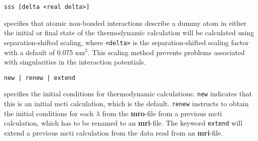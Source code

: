 \begin{description}
\item
\begin{verbatim}
sss [delta <real delta>]
\end{verbatim}
specifies that atomic non-bonded interactions describe a dummy atom
in either the initial or final state of the thermodynamic calculation
will be calculated using separation-shifted scaling, where \verb+<delta>+ 
is the separation-shifted scaling factor with a default of 0.075 nm$^2$.
This scaling method prevents problems associated with singularities in
the interaction potentials.

\item
\begin{verbatim}
new | renew | extend
\end{verbatim}
specifies the initial conditions for thermodynamic calculations.
{\tt new} indicates that this is an initial mcti calculation, which
is the default. {\tt renew} instructs to obtain the initial
conditions for each $\lambda$ from the {\bf mro}-file from a previous 
mcti calculation, which has to be renamed to an {\bf mri}-file. The
keyword {\tt extend} will extend a previous mcti calculation from the
data read from an {\bf mri}-file.
\end{description}

